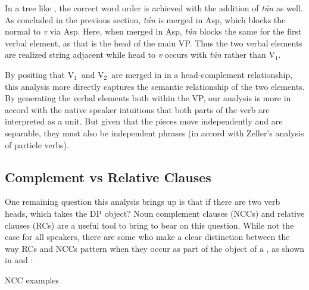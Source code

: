 \documentclass[output=paper]{LSP/langsci}
\begin{document}
In a tree like , the correct word order is achieved with the addition of \textit{t\'{u}n} as well. As concluded in the previous section, \textit{t\'{u}n} is merged in Asp, which blocks the normal  to \textit{v} via Asp. Here, when merged in Asp, \textit{t\'{u}n} blocks the same  for the first verbal element, as that is the head of the main VP. Thus the two verbal elements are realized string adjacent while head  to \textit{v} occurs with \textit{t\'{u}n} rather than V$_{1}$.

By positing that V$_{1}$\ and V$_{2}$\ are merged in in a head-complement relationship, this analysis more directly captures the semantic relationship of the two elements. By generating the verbal elements both within the VP, our analysis is more in accord with the native speaker intuitions that both parts of the verb are interpreted as a unit. But given that the pieces move independently and are separable, they must also be independent phrases (in accord with Zeller's analysis of particle verbs).


\subsection{Complement vs Relative Clauses}
One remaining question this analysis brings up is that if there are two verb heads, which takes the DP object? Noun complement clauses (NCCs) and relative clauses (RCs) are a useful tool to bring to bear on this question. While not the case for all speakers, there are some who make a clear distinction between the way RCs and NCCs pattern when they occur as part of the object of a , as shown in  and :

\ea NCC examples

\z 
\label{ex:parrish:believe-story}
\z
\end{document}
